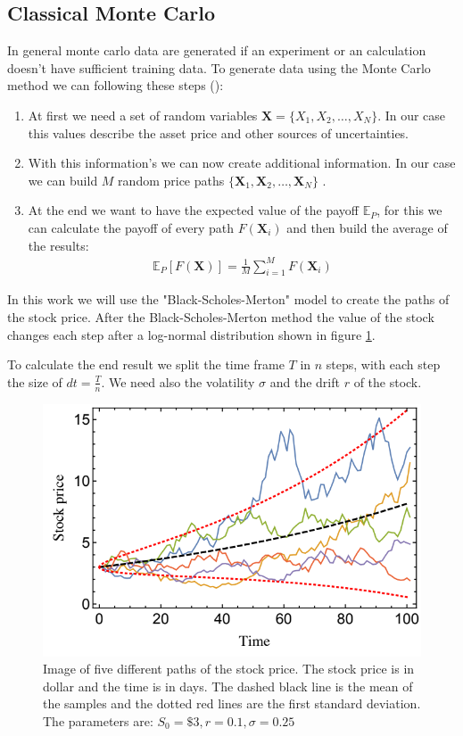 \documentclass[../../main.tex]{subfiles}
\begin{document}
\subsection{Classical Monte Carlo}\label{sec: cmc}
In general monte carlo data are generated if an experiment or an calculation doesn't have sufficient training data. To generate data using the Monte Carlo method we can following these steps (\cite{Stamatopoulos_2019}):

\begin{enumerate}
	\item At first we need a set of random variables $\textbf{X}=\{X_1, X_2, \dots, X_N\}$. In our case this values describe the asset price and other sources of uncertainties.
	\item With this information's we can now create additional information. In our case we can build $M$ random price paths $\{ \textbf{X}_1, \textbf{X}_2, \dots, \textbf{X}_N \}$ .
	\item At the end we want to have the expected value of the payoff $\mathbb{E}_P$, for this we can calculate the payoff of every path $F(\textbf{X}_i)$ and then build the average of the results:
	    \begin{align}
	        \mathbb{E}_P[F(\textbf{X})] = \frac{1}{M} \sum_{i=1}^{M} F(\textbf{X}_i)
	    \end{align}
\end{enumerate}

In this work we will use the "Black-Scholes-Merton" model to create the paths of the stock price. After the Black-Scholes-Merton method the value of the stock changes each step after a log-normal distribution shown in figure \ref{fig:stockPaths}.

To calculate the end result we split the time frame $T$ in $n$ steps, with each step the size of $dt=\frac{T}{n}$. We need also the volatility $\sigma$ and the drift $r$ of the stock.

\begin{figure}[H]
  \begin{center}
    \includegraphics[width=0.5\linewidth]{../../../images/stock_path.png}
  \end{center}
  \caption{Image of five different paths of the stock price. The stock price is in dollar and the time is in days. The dashed black line is the mean of the samples and the dotted red lines are the first standard deviation. The parameters are: $S_0=\$3, r=0.1, \sigma=0.25$ \cite{Rebentrost_2018}}
  \label{fig:stockPaths}
\end{figure}
\end{document}
